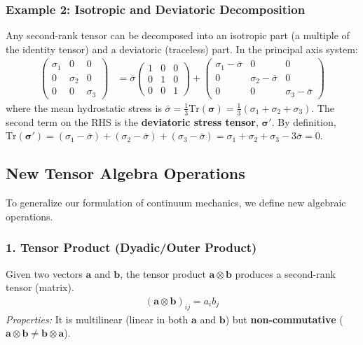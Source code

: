 \subsubsection*{Example 2: Isotropic and Deviatoric Decomposition}
Any second-rank tensor can be decomposed into an isotropic part (a multiple of the identity tensor) and a deviatoric (traceless) part. In the principal axis system:
\begin{align}
    \begin{pmatrix} \sigma_1 & 0 & 0 \\ 0 & \sigma_2 & 0 \\ 0 & 0 & \sigma_3 \end{pmatrix} 
    &= \bar{\sigma} \begin{pmatrix} 1 & 0 & 0 \\ 0 & 1 & 0 \\ 0 & 0 & 1 \end{pmatrix} 
    + \begin{pmatrix} \sigma_1 - \bar{\sigma} & 0 & 0 \\ 0 & \sigma_2 - \bar{\sigma} & 0 \\ 0 & 0 & \sigma_3 - \bar{\sigma} \end{pmatrix}
\end{align}
where the mean hydrostatic stress is $\bar{\sigma} = \frac{1}{3}\text{Tr}(\mathbf{\sigma}) = \frac{1}{3}(\sigma_1 + \sigma_2 + \sigma_3)$.
The second term on the RHS is the \textbf{deviatoric stress tensor}, $\mathbf{\sigma}'$. By definition, $\text{Tr}(\mathbf{\sigma}') = (\sigma_1 - \bar{\sigma}) + (\sigma_2 - \bar{\sigma}) + (\sigma_3 - \bar{\sigma}) = \sigma_1 + \sigma_2 + \sigma_3 - 3\bar{\sigma} = 0$.

\subsection*{New Tensor Algebra Operations}

To generalize our formulation of continuum mechanics, we define new algebraic operations.

\subsubsection*{1. Tensor Product (Dyadic/Outer Product)}
Given two vectors $\mathbf{a}$ and $\mathbf{b}$, the tensor product $\mathbf{a} \otimes \mathbf{b}$ produces a second-rank tensor (matrix).
\begin{align}
    (\mathbf{a} \otimes \mathbf{b})_{ij} = a_i b_j
\end{align}
\textit{Properties:} It is multilinear (linear in both $\mathbf{a}$ and $\mathbf{b}$) but \textbf{non-commutative} ($\mathbf{a} \otimes \mathbf{b} \neq \mathbf{b} \otimes \mathbf{a}$).

